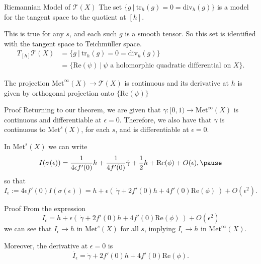 \documentclass[professionalfont]{beamer}
\begin{document}


\begin{frame}{Riemannian Model of $\mathcal{T}(X)$}
The set $\{ g \ | \ \mathrm{tr}_h (g) = 0 = \mathrm{div}_h(g) \}$ is a model for the tangent space to the quotient at $[h]$. 
\newline

This is true for any $s$, and each such $g$ is a smooth tensor. So this set is identified with the tangent space to Teichm\"uller space.
\begin{align*}
T_{[h]}\mathcal{T}(X)
&= \{ g \ | \ \mathrm{tr}_h (g) = 0 = \mathrm{div}_h(g) \} \\
&= \{ \mathrm{Re}(\psi) \ | \ \psi \text{ a holomorphic quadratic differential on } X \}.
\end{align*} \pause

The projection $\mathrm{Met}^\infty(X) \to \mathcal{T}(X)$ is continuous and its derivative at $h$ is given by orthogonal projection onto $\{ \mathrm{Re}(\psi) \}$




\end{frame}







\begin{frame}{Proof}
Returning to our theorem, we are given that $\gamma:[0,1) \to \mathrm{Met}^\infty(X)$ is continuous and differentiable at $\epsilon = 0$. 
Therefore, we also have that $\gamma$ is continuous to $\mathrm{Met}^s(X)$, for each $s$, and is differentiable at $\epsilon = 0$. \pause
\newline

In $\mathrm{Met}^s(X)$ we can write 
\[
I(\sigma(\epsilon)) =  \frac{1}{4\epsilon f'(0)} h + \frac{1}{4 f'(0)} \dot{\gamma} + \frac{1}{2} h + \mathrm{Re}(\phi) + O(\epsilon), \pause
\]
so that 
\[
I_\epsilon := 4\epsilon f'(0)I(\sigma(\epsilon)) = h + \epsilon( \ \dot{\gamma} + 2 f'(0)h + 4 f'(0) \mathrm{Re}(\phi) \ ) + O(\epsilon^2).
\]

\end{frame}




\begin{frame}{Proof}
From the expression
\[
I_\epsilon = h + \epsilon( \ \dot{\gamma} + 2 f'(0)h + 4 f'(0) \mathrm{Re}(\phi) \ ) + O(\epsilon^2)
\]
we can see that $I_\epsilon \to h$ in $\mathrm{Met}^s(X)$ for all $s$, implying $I_\epsilon \to h$ in $\mathrm{Met}^\infty(X)$. 
\newline

Moreover, the derivative at $\epsilon = 0$ is 
\[
\dot{I_\epsilon}  = \dot{\gamma} + 2 f'(0) h + 4 f'(0) \mathrm{Re}(\phi).
\]

\end{frame}
\end{document}
